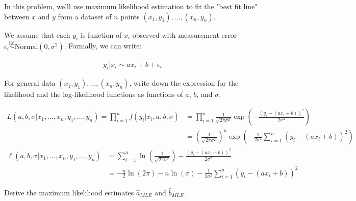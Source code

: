 \documentclass{article}
\newcommand{\iid}{\stackrel{\text{iid}}{\sim}}
\begin{document}
\begin{probset}
\begin{prob}
In this problem, we'll use maximum likelihood estimation to fit the "best fit line" between $x$ and $y$ from a dataset of $n$ points $(x_1, y_1), \dots, (x_n, y_n)$.

We assume that each $y_i$ is function of $x_i$ observed with measurement error $\epsilon_i \iid \text{Normal}(0, \sigma^2)$. Formally, we can write:

\begin{align}
    y_i | x_i \sim a x_i + b + \epsilon_i 
\end{align}

\begin{subprobset}
    \begin{subprob}
        For general data $(x_1, y_1), \dots, (x_n, y_n)$, write down the expression for the likelihood and the log-likelihood functions as functions of $a$, $b$, and $\sigma$.

        \begin{soln}
            \begin{align*}
                L(a,b,\sigma | x_1, \dots, x_n, y_1, \dots, y_n) = \prod_{i=1}^n f(y_i|x_i,a,b,\sigma) &= \prod_{i=1}^n \frac{1}{\sqrt{2\pi\sigma^2}} \exp\left(-\frac{(y_i - (a x_i + b))^2}{2\sigma^2}\right) \\
                &= \left( \frac{1}{\sqrt{2\pi\sigma^2}} \right)^n \exp\left(-\frac{1}{2\sigma^2} \sum_{i=1}^n (y_i - (a x_i + b))^2 \right)
            \end{align*}
            \begin{align*}
                \ell(a,b,\sigma | x_1, \dots, x_n, y_1, \dots, y_n) &= \sum_{i=1}^n \ln\left(\frac{1}{\sqrt{2\pi\sigma^2}}\right) - \frac{(y_i - (a x_i + b))^2}{2\sigma^2} \\
                &= -\frac{n}{2} \ln\left(2\pi\right) - n \ln(\sigma) - \frac{1}{2\sigma^2} \sum_{i=1}^n (y_i - (a x_i + b))^2
            \end{align*}
        \end{soln}
    \end{subprob}

    \newpage

    \begin{subprob}
        Derive the maximum likelihood estimates $\hat{a}_{MLE}$ and $\hat{b}_{MLE}$.


\end{subprob}
\end{subprobset}
\end{prob}
\end{probset}
\end{document}
